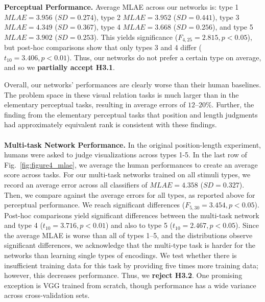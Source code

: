 
\noindent\textbf{Perceptual Performance.}  Average MLAE across our networks is: 
type 1 $MLAE= 3.956 $ ($SD= 0.274 $),
type 2 $MLAE= 3.952 $ ($SD= 0.441 $),
type 3 $MLAE= 4.349 $ ($SD= 0.367 $),
type 4 $MLAE= 3.668 $ ($SD= 0.256 $), and 
type 5 $MLAE= 3.902 $ ($SD= 0.253 $). This yields significance ($F_{4,25}=2.815, p<0.05$), but post-hoc comparisons show that only types 3 and 4 differ ($t_{10}=3.406, p<0.01$). Thus, our networks do not prefer a certain type on average, and so we \textbf{partially accept H3.1}. %

Overall, our networks' performances are clearly worse than their human baselines. The problem space in these visual relation tasks is much larger than in the elementary perceptual tasks, resulting in average errors of $12$--$20\%$. Further, the finding from the elementary perceptual tasks that position and length judgments had approximately equivalent rank is consistent with these findings.
\\~\\
\noindent\textbf{Multi-task Network Performance.} In the original position-length experiment, humans were asked to judge visualizations across types 1-5. In the last row of Fig.~\ref{fig:figure4_mlae}, we average the human performances to create an average score across tasks. For our multi-task networks trained on all stimuli types, we record an average error across all classifiers of $MLAE=4.358$ ($SD=0.327$). Then, we compare against the average errors for all types, as reported above for perceptual performance. We reach significant differences ($F_{5,30}=3.454,p<0.05$). Post-hoc comparisons yield significant differences between the multi-task network and type 4 ($t_{10}=3.716, p<0.01$) and also to type 5 ($t_{10}=2.467, p<0.05$). Since the average MLAE is worse than all of types 1--5, and the distributions observe significant differences, we acknowledge that the multi-type task is harder for the networks than learning single types of encodings. We test whether there is insufficient training data for this task by providing five times more training data; however, this decreases performance. Thus, we \textbf{reject H3.2}. One promising exception is VGG trained from scratch, though performance has a wide variance across cross-validation sets.